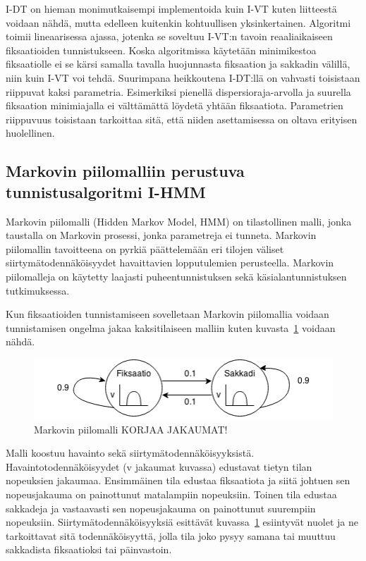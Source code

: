 I-DT on hieman monimutkaisempi implementoida kuin I-VT kuten liitteestä \emph{} voidaan nähdä, mutta edelleen kuitenkin kohtuullisen yksinkertainen. Algoritmi toimii lineaarisessa ajassa, jotenka se soveltuu I-VT:n tavoin reaaliaikaiseen fiksaatioiden tunnistukseen. Koska algoritmissa käytetään minimikestoa fiksaatiolle ei se kärsi samalla tavalla huojunnasta fiksaation ja sakkadin välillä, niin kuin I-VT voi tehdä. Suurimpana heikkoutena I-DT:llä on vahvasti toisistaan riippuvat kaksi parametria. Esimerkiksi pienellä dispersioraja-arvolla ja suurella fiksaation minimiajalla ei välttämättä löydetä yhtään fiksaatiota. Parametrien riippuvuus toisistaan tarkoittaa sitä, että niiden asettamisessa on oltava erityisen huolellinen.


\subsection{Markovin piilomalliin perustuva tunnistusalgoritmi I-HMM}

Markovin piilomalli (Hidden Markov Model, HMM) on tilastollinen malli, jonka taustalla on Markovin prosessi, jonka parametreja ei tunneta. Markovin piilomallin tavoitteena on pyrkiä päättelemään eri tilojen väliset siirtymätodennäköisyydet havaittavien lopputulemien perusteella. Markovin piilomalleja on käytetty laajasti puheentunnistuksen sekä käsialantunnistuksen tutkimuksessa.\citep[s. 257-286]{rabiner1989tutorial}

Kun fiksaatioiden tunnistamiseen sovelletaan Markovin piilomallia voidaan tunnistamisen ongelma jakaa kaksitilaiseen malliin kuten kuvasta~\ref{fig:hmm_sample} voidaan nähdä. 

\begin{figure}[h]
    \includegraphics[width=1.0\textwidth]{HMM.png}
		\caption{Markovin piilomalli KORJAA JAKAUMAT!}
		\label{fig:hmm_sample}
\end{figure}

Malli koostuu havainto sekä siirtymätodennäköisyyksistä. Havaintotodennäköisyydet (v jakaumat kuvassa) edustavat tietyn tilan nopeuksien jakaumaa. Ensimmäinen tila edustaa fiksaatiota ja siitä johtuen sen nopeusjakauma on painottunut matalampiin nopeuksiin. Toinen tila edustaa sakkadeja ja vastaavasti sen nopeusjakauma on painottunut suurempiin nopeuksiin. Siirtymätodennäköisyyksiä esittävät kuvassa~\ref{fig:hmm_sample} esiintyvät nuolet ja ne tarkoittavat sitä todennäköisyyttä, jolla tila joko pysyy samana tai muuttuu sakkadista fiksaatioksi tai päinvastoin.

